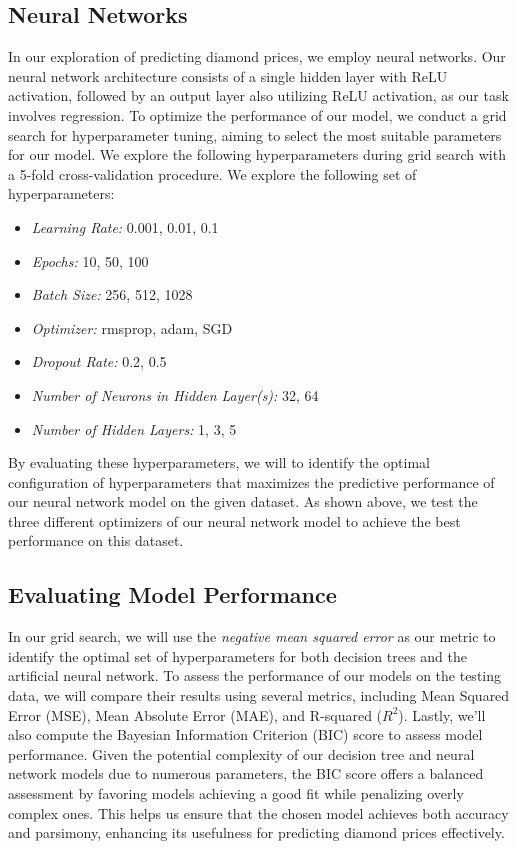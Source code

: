 \documentclass[conference]{IEEEtran}
\begin{document}
\subsection{Neural Networks}

In our exploration of predicting diamond prices, we employ neural networks. Our neural network architecture consists of a single hidden layer with ReLU activation, followed by an output layer also utilizing ReLU activation, as our task involves regression. To optimize the performance of our model, we conduct a grid search for hyperparameter tuning, aiming to select the most suitable parameters for our model. We explore the following hyperparameters during grid search with a 5-fold cross-validation procedure. We explore the following set of hyperparameters:

\begin{itemize}
    \item \emph{Learning Rate:} 0.001, 0.01, 0.1
    \item \emph{Epochs:} 10, 50, 100
    \item \emph{Batch Size:} 256, 512, 1028
    \item \emph{Optimizer:} rmsprop, adam, SGD
    \item \emph{Dropout Rate:} 0.2, 0.5
    \item \emph{Number of Neurons in Hidden Layer(s):} 32, 64
    \item \emph{Number of Hidden Layers:} 1, 3, 5
\end{itemize}

By evaluating these hyperparameters, we will to identify the optimal configuration of hyperparameters that maximizes the predictive performance of our neural network model on the given dataset. As shown above, we test the three different optimizers of our neural network model to achieve the best performance on this dataset.

\subsection{Evaluating Model Performance}

In our grid search, we will use the \emph{negative mean squared error} as our metric to identify the optimal set of hyperparameters for both decision trees and the artificial neural network. To assess the performance of our models on the testing data, we will compare their results using several metrics, including Mean Squared Error (MSE), Mean Absolute Error (MAE), and R-squared ($R^2$). Lastly, we'll also compute the Bayesian Information Criterion (BIC) score to assess model performance. Given the potential complexity of our decision tree and neural network models due to numerous parameters, the BIC score offers a balanced assessment by favoring models achieving a good fit while penalizing overly complex ones. This helps us ensure that the chosen model achieves both accuracy and parsimony, enhancing its usefulness for predicting diamond prices effectively.
\end{document}
